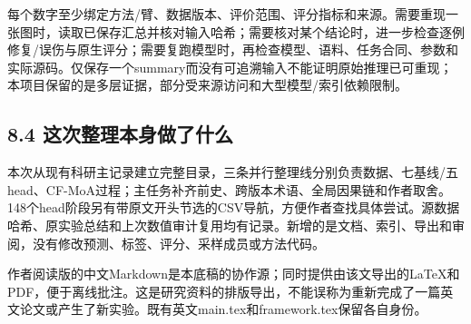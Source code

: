 \documentclass[
  11pt,
  a4paper,
]{article}
\begin{document}
每个数字至少绑定方法/臂、数据版本、评价范围、评分指标和来源。需要重现一张图时，读取已保存汇总并核对输入哈希；需要核对某个结论时，进一步检查逐例修复/误伤与原生评分；需要复跑模型时，再检查模型、语料、任务合同、参数和实际源码。仅保存一个summary而没有可追溯输入不能证明原始推理已可重现；本项目保留的是多层证据，部分受来源访问和大型模型/索引依赖限制。

\subsection{8.4
这次整理本身做了什么}\label{ux8fd9ux6b21ux6574ux7406ux672cux8eabux505aux4e86ux4ec0ux4e48}

本次从现有科研主记录建立完整目录，三条并行整理线分别负责数据、七基线/五head、CF-MoA过程；主任务补齐前史、跨版本术语、全局因果链和作者取舍。148个head阶段另有带原文开头节选的CSV导航，方便作者查找具体尝试。源数据哈希、原实验总结和上次数值审计复用均有记录。新增的是文档、索引、导出和审阅，没有修改预测、标签、评分、采样成员或方法代码。

作者阅读版的中文Markdown是本底稿的协作源；同时提供由该文导出的LaTeX和PDF，便于离线批注。这是研究资料的排版导出，不能误称为重新完成了一篇英文论文或产生了新实验。既有英文main.tex和framework.tex保留各自身份。
\end{document}
